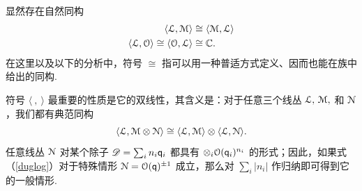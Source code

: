 显然存在自然同构
\begin{align}
\langle {\cal L},{\cal M}\rangle & \cong \langle {\cal M},{\cal
L}\rangle \\ \nonumber \langle {\cal L},{\cal O}\rangle \cong
\langle{\cal O},{\cal L}\rangle& \cong \Bbb{C}.\end{align} 在这里以及以下的分析中，符号 $\cong$ 指可以用一种普适方式定义、因而也能在族中给出的同构.

符号 $\langle~,~\rangle$ 最重要的性质是它的双线性，其含义是：对于任意三个线丛 ${\cal
L},\,{\cal M},$ 和 ${\cal N}$，我们都有典范同构
\begin{equation}\label{duglog} \langle{\cal L},{\cal M}\otimes {\cal 
N}\rangle\cong\langle{\cal L},{\cal M}\rangle \otimes \langle
{\cal L},{\cal N}\rangle.\end{equation} 任意线丛 ${\cal N}$ 对某个除子 ${\DD}=\sum_in_i\qq_i$ 都具有 $\otimes_i{\cal O}(\qq_i)^{n_i}$ 的形式；因此，如果式（\ref{duglog}）对于特殊情形 ${\cal N}={\cal
O}(\qq)^{\pm 1}$ 成立，那么对 $\sum_i|n_i|$ 作归纳即可得到它的一般情形.


